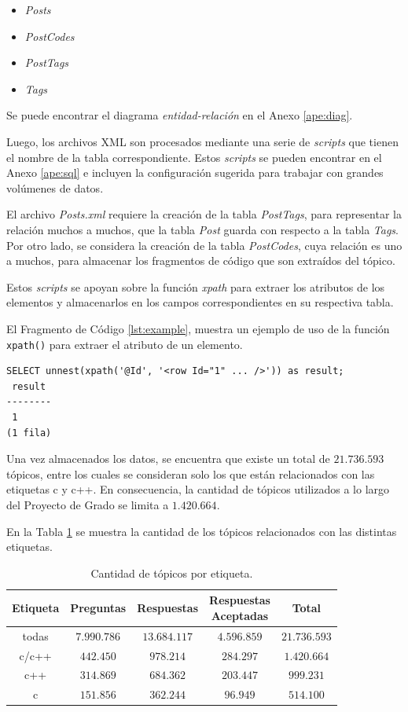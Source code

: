 \begin{itemize}
  \item \textit{Posts}
  \item \textit{PostCodes}
  \item \textit{PostTags}
  \item \textit{Tags}
\end{itemize}

Se puede encontrar el diagrama \textit{entidad-relación} en el Anexo \ref{ape:diag}.

Luego, los archivos \ac{XML} son procesados
mediante una serie de \textit{scripts} que 
tienen el nombre de la tabla correspondiente.
Estos \textit{scripts} se pueden encontrar en el Anexo \ref{ape:sql}
e incluyen la configuración sugerida para trabajar con
grandes volúmenes de datos.

El archivo \textit{Posts.xml} requiere la creación de la tabla \textit{PostTags},
para representar la relación muchos a muchos,
que la tabla \textit{Post} guarda con respecto a la tabla \textit{Tags}.
Por otro lado, se considera la creación de la tabla \textit{PostCodes},
cuya relación es uno a muchos,
para almacenar los fragmentos de código que son extraídos del tópico.

Estos \textit{scripts} se apoyan sobre la función \textit{xpath}
para extraer los atributos de los elementos y almacenarlos en los campos
correspondientes en su respectiva tabla.

El Fragmento de Código \ref{lst:example}, muestra un ejemplo de uso de la función
\lstinline{xpath()} para extraer el atributo de un elemento.

\begin{lstlisting}[caption={Función xpath.},label={lst:example}]
SELECT unnest(xpath('@Id', '<row Id="1" ... />')) as result;
 result
--------
 1
(1 fila)
\end{lstlisting}

Una vez almacenados los datos, se encuentra que existe un total de $21.736.593$ tópicos,
entre los cuales se consideran solo los que están relacionados con las etiquetas c y c++.
En consecuencia, la cantidad de tópicos utilizados a lo largo del Proyecto de Grado se limita a $1.420.664$.

En la Tabla \ref{tab:topicos} se muestra la cantidad de los tópicos relacionados con las distintas etiquetas.
\begin{table}[h]
\caption{Cantidad de tópicos por etiqueta.}
\label{tab:topicos}
\centering
\begin{tabular}{ccccc}
\hline
{Etiqueta} & {Preguntas} & {Respuestas} & \makecell{Respuestas\\Aceptadas} & {Total} \\
\hline
{todas} & $7.990.786$ & $13.684.117$ & $4.596.859$ & $21.736.593$ \\ 
{c/c++} & $442.450$ & $978.214$ & $284.297$ & $1.420.664$ \\ 
{c++} & $314.869$ & $684.362$ & $203.447$ & $999.231$ \\ 
{c} & $151.856$ & $362.244$ & $96.949$ & $514.100$ \\
\hline
\end{tabular}
\end{table}

